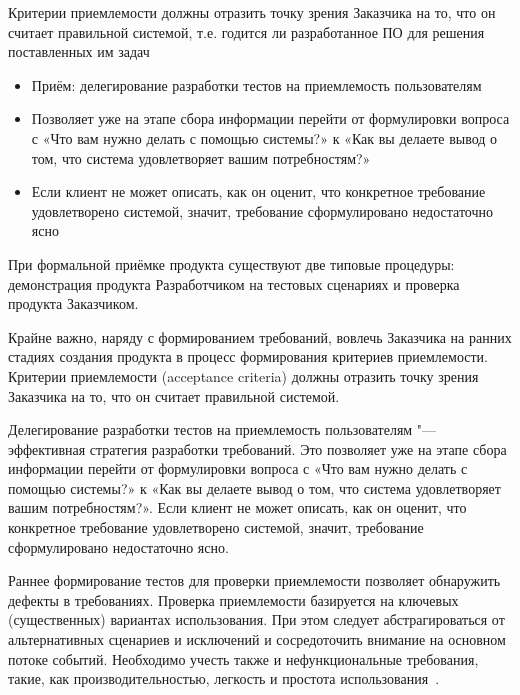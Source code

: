 \documentclass{../industrial-development}
\begin{document}
{\begin{frame}
  \begin{block}{}
\alert{Критерии приемлемости} должны отразить точку зрения Заказчика на то, что он считает правильной системой, т.е. годится ли разработанное ПО для решения поставленных им задач
	  \end{block}
		\begin{itemize}
\item Приём: делегирование разработки тестов на приемлемость пользователям
\item Позволяет уже на этапе сбора информации перейти от формулировки вопроса с \alert{«Что вам нужно делать с помощью системы?»} к \alert{«Как вы делаете вывод о том, что система удовлетворяет вашим потребностям?»}
\item Если клиент не может описать, как он оценит, что конкретное требование удовлетворено системой, значит, требование сформулировано недостаточно ясно
\end{itemize}
\end{frame}


\lecturenotes

При формальной приёмке продукта существуют две типовые процедуры: демонстрация продукта Разработчиком на тестовых сценариях и проверка продукта Заказчиком.

Крайне важно, наряду с формированием требований, вовлечь Заказчика на ранних стадиях создания продукта в процесс формирования критериев приемлемости. \alert{Критерии приемлемости (acceptance criteria)} должны отразить точку зрения Заказчика на то, что он считает правильной системой.

Делегирование разработки тестов на приемлемость пользователям "--- эффективная стратегия разработки требований. Это позволяет уже на этапе сбора информации перейти от формулировки вопроса с «Что вам нужно делать с помощью системы?» к «Как вы делаете вывод о том, что система удовлетворяет вашим потребностям?». Если клиент не может описать, как он оценит, что конкретное требование удовлетворено системой, значит, требование сформулировано недостаточно ясно.

Раннее формирование тестов для проверки приемлемости позволяет обнаружить дефекты в требованиях. Проверка приемлемости базируется на ключевых (существенных) вариантах использования. При этом следует абстрагироваться от альтернативных сценариев и исключений и сосредоточить внимание на основном потоке событий. Необходимо учесть также и нефункциональные требования, такие, как производительностью, легкость и простота использования~\cite[с.~68]{Maglinec}.


}
\end{document}
